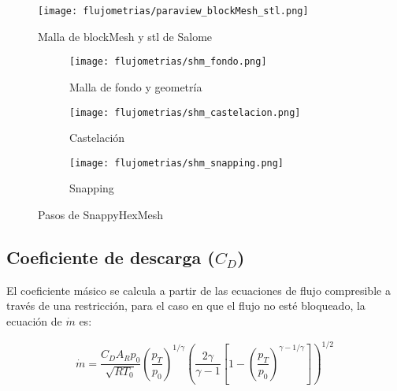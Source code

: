 \begin{figure}
    \centering
    \texttt{[image: flujometrias/paraview\_blockMesh\_stl.png]}
    \caption{Malla de blockMesh y stl de Salome}\label{fig:paraview_blockMesh_stl}
\end{figure}

\begin{figure}[t!]
    \centering
    \begin{subfigure}[t]{0.5\textwidth}
        \centering
        \texttt{[image: flujometrias/shm\_fondo.png]}
        \caption{Malla de fondo y geometría}
    \end{subfigure}%
    \begin{subfigure}[t]{0.5\textwidth}
        \centering
        \texttt{[image: flujometrias/shm\_castelacion.png]}
        \caption{Castelación}
    \end{subfigure}
    \begin{subfigure}[t]{0.5\textwidth}
        \centering
        \texttt{[image: flujometrias/shm\_snapping.png]}
        \caption{Snapping}
    \end{subfigure}
    \caption{Pasos de SnappyHexMesh\parencite{shm_steps}}\label{fig:openfoam_shm_pasos}
\end{figure}




\subsection{Coeficiente de descarga ($C_D$)}

El coeficiente másico se calcula a partir de las ecuaciones de flujo
compresible a través de una restricción, para el caso en que el flujo no esté
bloqueado, la ecuación de $\dot{m}$ es:

\begin{equation}
    \label{eq:m_not_choked}
    \dot{m} = \frac{C_D A_R p_0}{\sqrt{R T_0}}
            {\left(\frac{p_T}{p_0} \right)}^{1/\gamma}
            {\left( \frac{2\gamma}{\gamma-1} \left[1- {(\frac{p_T}{p_0})}^{{\gamma-1}/\gamma} \right] \right)}^{1/2}
\end{equation}

